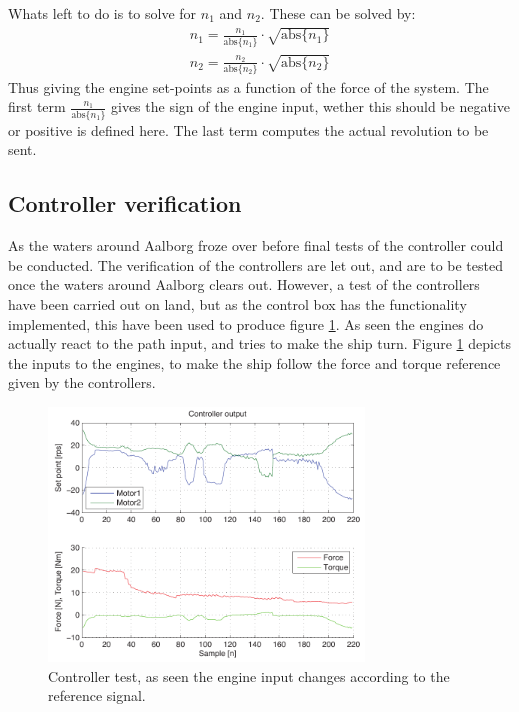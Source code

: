 \documentclass{ifacconf}
\begin{document}
Whats left to do is to solve for $n_1$ and $n_2$. These can be solved by:
\begin{align}
n_1 = \frac{n_1}{\text{abs}\{n_1\}} \cdot \sqrt{\text{abs}\{n_1\}}\\
n_2 = \frac{n_2}{\text{abs}\{n_2\}} \cdot \sqrt{\text{abs}\{n_2\}}
\end{align}
Thus giving the engine set-points as a function of the force of the system. The first term $\frac{n_1}{\text{abs}\{n_1\}}$ gives the sign of the engine input, wether this should be negative or positive is defined here. The last term computes the actual revolution to be sent. 


\subsection{Controller verification}
As the waters around Aalborg froze over before final tests of the controller could be conducted. The verification of the controllers are let out, and are to be tested once the waters around Aalborg clears out. However, a test of the controllers have been carried out on land, but as the control box has the functionality implemented, this have been used to produce figure \ref{fig:control}. As seen the engines do actually react to the path input, and tries to make the ship turn. Figure \ref{fig:control} depicts the inputs to the engines, to make the ship follow the force and torque reference given by the controllers.
\begin{figure}
	\begin{center}
		\includegraphics[width=8.4cm]{img/motorinput}    %
		\caption{Controller test, as seen the engine input changes according to the reference signal. }
		\label{fig:control}               
	\end{center}                                 %
\end{figure}
\end{document}
